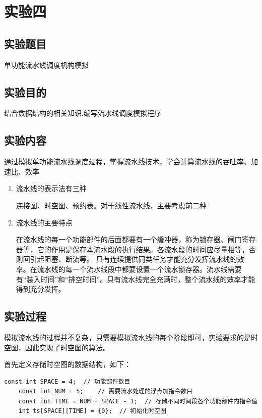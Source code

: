 \documentclass[UTF8,12pt]{article}
\begin{document}
\newpage

\section{实验四}
\subsection{实验题目}
单功能流水线调度机构模拟

\subsection{实验目的}
结合数据结构的相关知识,编写流水线调度模拟程序

\subsection{实验内容}
通过模拟单功能流水线调度过程，掌握流水线技术，学会计算流水线的吞吐率、加速比、效率

\begin{enumerate}
    \item 流水线的表示法有三种
    
    连接图、时空图、预约表。对于线性流水线，主要考虑前二种
    \item 流水线的主要特点
    
    在流水线的每一个功能部件的后面都要有一个缓冲器，称为锁存器、闸门寄存器等，它的作用是保存本流水段的执行结果。各流水段的时间应尽量相等，否则回引起阻塞、断流等。
    只有连续提供同类任务才能充分发挥流水线的效率。在流水线的每一个流水线段中都要设置一个流水锁存器。流水线需要有“装入时间”和“排空时间”。只有流水线完全充满时，整个流水线的效率才能得到充分发挥。
\end{enumerate}
\subsection{实验过程}
模拟流水线的过程并不复杂，只需要模拟流水线的每个阶段即可，实验要求的是时空图，因此实现了时空图的算法。

首先定义存储时空图的数据结构，如下：

\begin{lstlisting}[frame=shadowbox] 
    const int SPACE = 4;  // 功能部件数目
    const int NUM = 5;    // 需要流水处理的浮点加指令数目
    const int TIME = NUM + SPACE - 1;  // 存储不同时间段各个功能部件内指令值
    int ts[SPACE][TIME] = {0};  // 初始化时空图
\end{lstlisting}
\end{document}
